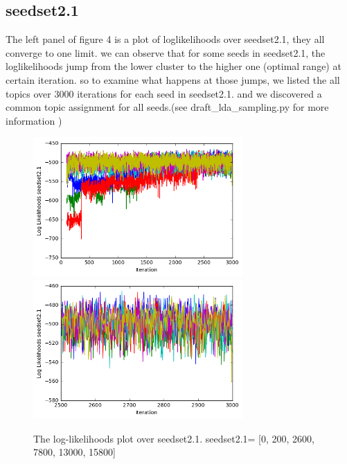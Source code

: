\documentclass[11pt]{article}
\begin{document}
\begin{spacing}{1.6}
\subsection{seedset2.1}
\noindent The left panel of figure 4 is a plot of loglikelihoods over seedset2.1, they all converge to one limit. we can observe that for some seeds in seedset2.1, the loglikelihoods jump from the lower cluster to the higher one (optimal range) at certain iteration. so to examine what happens at those jumps, we listed the all topics over 3000 iterations for each seed in seedset2.1. and we discovered a common topic assignment for all seeds.(see draft_lda_sampling.py for more information ) \\
\begin{minipage}{1.0\textwidth}
\begin{figure}[H]
\includegraphics[width = 80mm]{figure5.png}
\includegraphics[width = 80mm]{figure6.png}
\caption{The log-likelihoods plot over seedset2.1.  seedset2.1= [0, 200, 2600, 7800, 13000, 15800]}\scriptsize
\end{figure}
\end{minipage}\\



\end{spacing}
\end{document}

